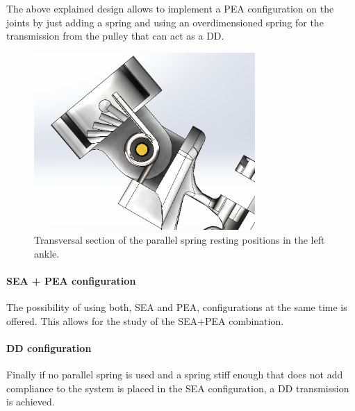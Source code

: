 The above explained design allows to implement a PEA configuration on the joints by just adding a spring and using an overdimensioned spring for the transmission from the pulley that can act as a DD.

\begin{figure}[ht!]
  \centering
  \includegraphics[width=0.75\textwidth]{figures/rotational_spring_rest_positions}
  \caption{Transversal section of the parallel spring resting positions in the left ankle.}
  \label{fig:rotational_spring_rest_position}
\end{figure}

\paragraph{SEA + PEA configuration} %
\label{ssub:sea_pea_configuration}
The possibility of using both, SEA and PEA, configurations at the same time is offered.
This allows for the study of the SEA+PEA combination.

\paragraph{DD configuration } %
\label{ssub:dd_configuration}
Finally if no parallel spring is used and a spring stiff enough that does not add compliance to the system is placed in the SEA configuration, a DD transmission is achieved.


